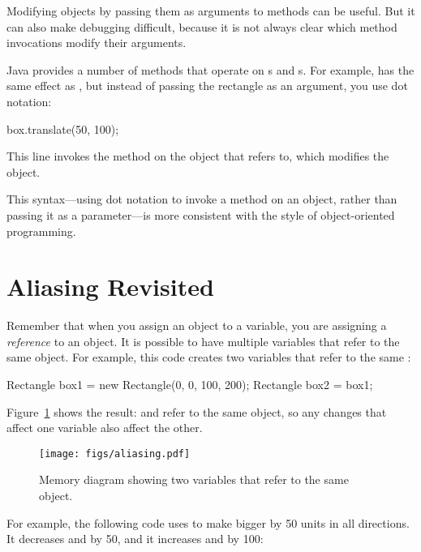 Modifying objects by passing them as arguments to methods can be useful.
But it can also make debugging difficult, because it is not always clear which method invocations modify their arguments.

Java provides a number of methods that operate on s and s.
For example,  has the same effect as , but instead of passing the rectangle as an argument, you use dot notation:

\begin{code}
box.translate(50, 100);
\end{code}

This line invokes the  method on the object that  refers to, which modifies the object.


This syntax---using dot notation to invoke a method on an object, rather than passing it as a parameter---is more consistent with the style of object-oriented programming.


\section{Aliasing Revisited}
\label{mutable-objects_aliasing-revisited}
\label{aliasing}


Remember that when you assign an object to a variable, you are assigning a {\em reference} to an object.
It is possible to have multiple variables that refer to the same object.
For example, this code creates two variables that refer to the same :

\begin{code}
Rectangle box1 = new Rectangle(0, 0, 100, 200);
Rectangle box2 = box1;
\end{code}

Figure~\ref{fig.aliasing} shows the result:  and  refer to the same object, so any changes that affect one variable also affect the other.

\begin{figure}[!ht]
\begin{center}
\texttt{[image: figs/aliasing.pdf]}
\caption{Memory diagram showing two variables that refer to the same  object.}
\label{fig.aliasing}
\end{center}
\end{figure}

For example, the following code uses  to make  bigger by 50 units in all directions.
It decreases  and  by 50, and it increases  and  by 100:

